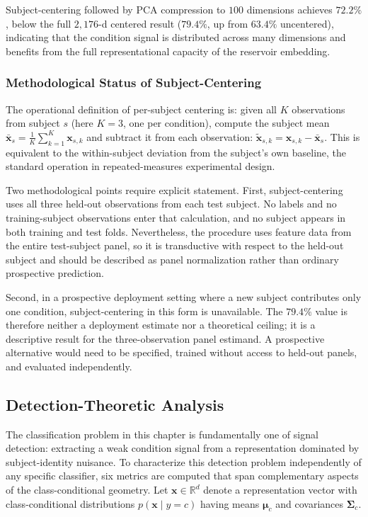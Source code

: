 Subject-centering followed by PCA compression to $100$ dimensions achieves $72.2\%$, below the full $2{,}176$-d centered result ($79.4\%$, up from $63.4\%$ uncentered), indicating that the condition signal is distributed across many dimensions and benefits from the full representational capacity of the reservoir embedding.

\subsubsection{Methodological Status of Subject-Centering}

The operational definition of per-subject centering is: given all $K$ observations from subject $s$ (here $K = 3$, one per condition), compute the subject mean $\bar{\mathbf{x}}_s = \frac{1}{K}\sum_{k=1}^K \mathbf{x}_{s,k}$ and subtract it from each observation: $\tilde{\mathbf{x}}_{s,k} = \mathbf{x}_{s,k} - \bar{\mathbf{x}}_s$. This is equivalent to the within-subject deviation from the subject's own baseline, the standard operation in repeated-measures experimental design.

Two methodological points require explicit statement. First, subject-centering uses all three held-out observations from each test subject. No labels and no training-subject observations enter that calculation, and no subject appears in both training and test folds. Nevertheless, the procedure uses feature data from the entire test-subject panel, so it is transductive with respect to the held-out subject and should be described as panel normalization rather than ordinary prospective prediction.

Second, in a prospective deployment setting where a new subject contributes only one condition, subject-centering in this form is unavailable. The $79.4\%$ value is therefore neither a deployment estimate nor a theoretical ceiling; it is a descriptive result for the three-observation panel estimand. A prospective alternative would need to be specified, trained without access to held-out panels, and evaluated independently.

\subsection{Detection-Theoretic Analysis}

The classification problem in this chapter is fundamentally one of signal detection: extracting a weak condition signal from a representation dominated by subject-identity nuisance. To characterize this detection problem independently of any specific classifier, six metrics are computed that span complementary aspects of the class-conditional geometry. Let $\mathbf{x} \in \mathbb{R}^d$ denote a representation vector with class-conditional distributions $p(\mathbf{x} \mid y = c)$ having means $\boldsymbol{\mu}_c$ and covariances $\boldsymbol{\Sigma}_c$.


